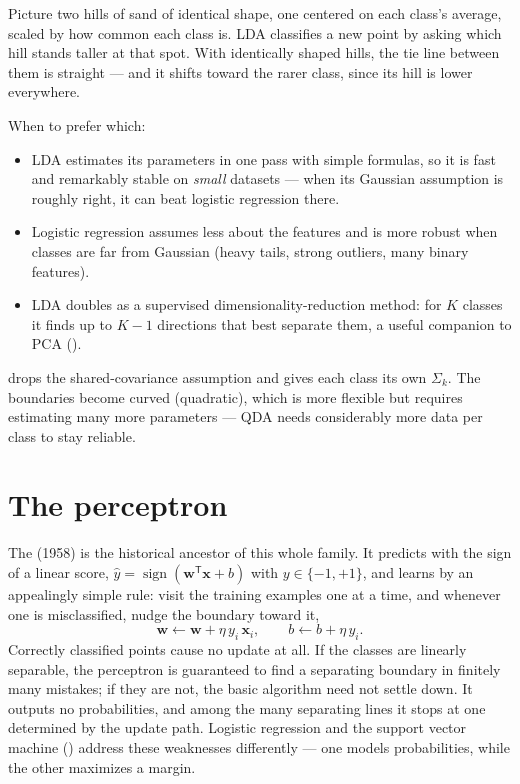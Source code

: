 \begin{intuition}
Picture two hills of sand of identical shape, one centered on each class's average, scaled by how common each class is. LDA classifies a new point by asking which hill stands taller at that spot. With identically shaped hills, the tie line between them is straight --- and it shifts toward the rarer class, since its hill is lower everywhere.
\end{intuition}

When to prefer which:

\begin{itemize}
  \item LDA estimates its parameters in one pass with simple formulas, so it is fast and remarkably stable on \emph{small} datasets --- when its Gaussian assumption is roughly right, it can beat logistic regression there.
  \item Logistic regression assumes less about the features and is more robust when classes are far from Gaussian (heavy tails, strong outliers, many binary features).
  \item LDA doubles as a supervised dimensionality-reduction method: for $K$ classes it finds up to $K-1$ directions that best separate them, a useful companion to PCA ().
\end{itemize}

 drops the shared-covariance assumption and gives each class its own $\Sigma_k$. The boundaries become curved (quadratic), which is more flexible but requires estimating many more parameters --- QDA needs considerably more data per class to stay reliable.

\section{The perceptron}

The  (1958) is the historical ancestor of this whole family. It predicts with the sign of a linear score, $\hat{y}=\operatorname{sign}(\bm{w}^{\mathsf T}\bm{x}+b)$ with $y\in\{-1,+1\}$, and learns by an appealingly simple rule: visit the training examples one at a time, and whenever one is misclassified, nudge the boundary toward it,
\[
  \bm{w}\leftarrow\bm{w}+\eta\,y_i\,\bm{x}_i,
  \qquad
  b\leftarrow b+\eta\,y_i.
\]
Correctly classified points cause no update at all. If the classes are linearly separable, the perceptron is guaranteed to find a separating boundary in finitely many mistakes; if they are not, the basic algorithm need not settle down. It outputs no probabilities, and among the many separating lines it stops at one determined by the update path. Logistic regression and the support vector machine () address these weaknesses differently --- one models probabilities, while the other maximizes a margin.

